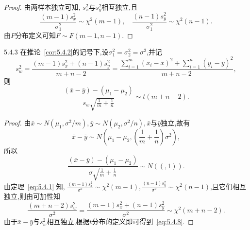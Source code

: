 \begin{proof}
由两样本独立可知, $s_x^2$与$s_y^2$相互独立,且
\[\frac{(m-1)s_x^2}{\sigma_1^2}\sim\chi^2(m-1),\quad
\frac{(n-1)s_y^2}{\sigma_1^2}\sim\chi^2(n-1).\]
由$F$分布定义可知$F\sim F(m-1,n-1)$.
\end{proof}
\begin{corollary}{}{5.4.3}
在推论~\ref{cor:5.4.2}的记号下,设$\sigma_1^2=\sigma_2^2=\sigma^2$,并记
\[
s_{w}^{2}=\frac{\left( m-1 \right) s_{x}^{2}+\left( n-1 \right) s_{y}^{2}}{m+n-2}=\frac{\sum_{i=1}^m{\left( x_i-\bar{x} \right) ^2}+\sum_{i=1}^n{\left( y_i-\bar{y} \right) ^2}}{m+n-2},
\]
则
\begin{equation}\label{eq:5.4.8}
\frac{\left( \bar{x}-\bar{y} \right) -\left( \mu _1-\mu _2 \right)}{s_w\sqrt{\frac{1}{m}+\frac{1}{n}}}\sim t\left( m+n-2 \right).
\end{equation}
\end{corollary}
\begin{proof}
由$\bar x\sim N(\mu_1,\sigma^2/m),\bar y\sim N(\mu_2,\sigma^2/n),\bar x$与$\bar y$独立,故有
\[\bar x-\bar y\sim N\left(\mu_1-\mu_2,\left(\frac1m+\frac1n\right)\sigma^2\right),\]
所以
\begin{equation}\label{eq:5.4.9}
\frac{\left( \bar{x}-\bar{y} \right) -\left( \mu _1-\mu _2 \right)}{\sigma \sqrt{\frac{1}{m}+\frac{1}{n}}}\sim N\left( \left( ,1 \right) \right).
\end{equation}
由定理~\ref{eq:5.4.1} 知, $\frac{(m-1)s_x^2}{\sigma^2}\sim\chi^2(m-1),
\frac{(n-1)s_y^2}{\sigma^2}\sim\chi^2(n-1)$,且它们相互独立,则由可加性知
\begin{equation}\label{eq:5.4.10}
\frac{\left( m+n-2 \right) s_{w}^{2}}{\sigma ^2}=\frac{\left( m-1 \right) s_{x}^{2}+\left( n-1 \right) s_{y}^{2}}{\sigma ^2}\sim \chi ^2\left( m+n-2 \right).
\end{equation}
由于$\bar x-\bar y$与$s_w^2$相互独立,根据$t$分布的定义即可得到~\eqref{eq:5.4.8}.
\end{proof}
